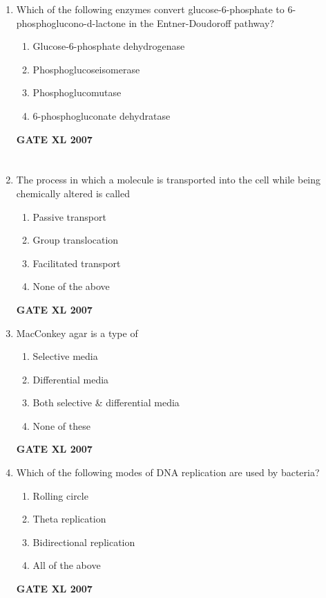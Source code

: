 \documentclass[journal,12pt,onecolumn]{IEEEtran}
\begin{document}
\begin{enumerate}
\item Which of the following enzymes convert glucose-6-phosphate to 6-phosphoglucono-d-lactone in the Entner-Doudoroff pathway?
\begin{enumerate}
    \item Glucose-6-phosphate dehydrogenase
    \item Phosphoglucoseisomerase
    \item Phosphoglucomutase
    \item 6-phosphogluconate dehydratase
\end{enumerate}\hfill{\textbf{GATE XL 2007}}
\section*{} %

\item The process in which a molecule is transported into the cell while being chemically altered is called
\begin{enumerate}
    \item Passive transport
    \item Group translocation
    \item Facilitated transport
    \item None of the above
\end{enumerate}\hfill{\textbf{GATE XL 2007}}

\item MacConkey agar is a type of
\begin{enumerate}
    \item Selective media
    \item Differential media
    \item Both selective \& differential media
    \item None of these
\end{enumerate}\hfill{\textbf{GATE XL 2007}}

\item Which of the following modes of DNA replication are used by bacteria?
\begin{enumerate}
    \item Rolling circle
    \item Theta replication
    \item Bidirectional replication
    \item All of the above
\end{enumerate}\hfill{\textbf{GATE XL 2007}}


\end{enumerate}
\end{document}
